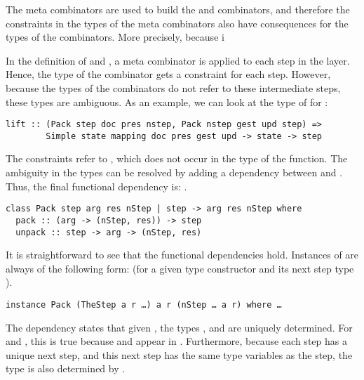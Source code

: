 \bc
The meta combinators are used to build the  and  combinators, and therefore the constraints in the types of the meta combinators also have consequences for the types of the combinators. More precisely, because i
\ec

In the definition of  and , a meta combinator is applied to each step in the layer. Hence, the type of the combinator gets a constraint for each step. However, because the types of the combinators do not refer to these intermediate steps, these types are ambiguous. As an example, we can look at the type of  for :

\begin{small}
\begin{verbatim}
lift :: (Pack step doc pres nstep, Pack nstep gest upd step) =>
        Simple state mapping doc pres gest upd -> state -> step
\end{verbatim}
\end{small}

The  constraints refer to , which does not occur in the type of the function. The ambiguity in the types can be resolved by adding a dependency between  and . Thus, the final functional dependency is: . 

\begin{small}
\begin{verbatim} 
class Pack step arg res nStep | step -> arg res nStep where
  pack :: (arg -> (nStep, res)) -> step
  unpack :: step -> arg -> (nStep, res)
\end{verbatim}
\end{small}

It is straightforward to see that the functional dependencies hold. Instances of  are always of the following form: (for a given type constructor  and its next step type ).

{\tt instance Pack (TheStep a r \dots) a r (nStep \dots~a r) where \dots}

 The dependency states that given , the types ,  and  are uniquely determined. For  and , this is true because  and  appear in . Furthermore, because each step has a unique next step, and this next step has the same type variables as the step, the type  is also determined by . 
 
